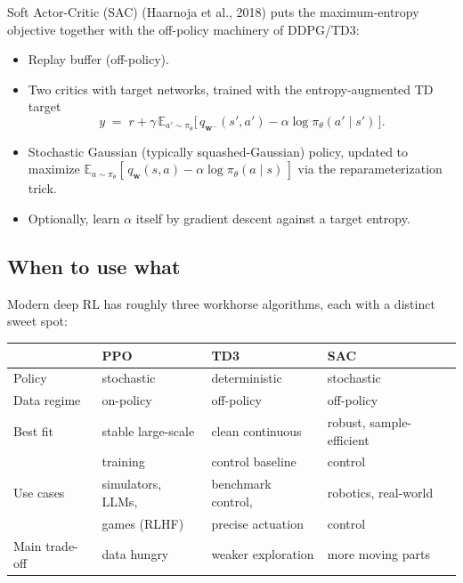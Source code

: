 \documentclass[11pt, oneside]{book}
\newcommand{\E}{\mathbb{E}}              %
\begin{document}
Soft Actor-Critic (SAC) (Haarnoja et al., 2018) puts the maximum-entropy objective
together with the off-policy machinery of DDPG/TD3:
\begin{itemize}
  \item Replay buffer (off-policy).
  \item Two critics with target networks, trained with the entropy-augmented TD target
  \[
    y \;=\; r + \gamma\, \E_{a' \sim \pi_\theta}\!\bigl[\, q_{\mathbf{w}^-}(s', a') - \alpha \log \pi_\theta(a' \mid s')\, \bigr].
  \]
  \item Stochastic Gaussian (typically squashed-Gaussian) policy, updated to maximize
    $\E_{a \sim \pi_\theta}[\, q_\mathbf{w}(s,a) - \alpha \log \pi_\theta(a \mid s)\, ]$
    via the reparameterization trick.
  \item Optionally, learn $\alpha$ itself by gradient descent against a target entropy.
\end{itemize}

\subsection{When to use what}

Modern deep RL has roughly three workhorse algorithms, each with a distinct sweet spot:

\begin{center}
\begin{tabular}{llll}
\toprule
                & \textbf{PPO}        & \textbf{TD3}       & \textbf{SAC} \\
\midrule
Policy          & stochastic           & deterministic       & stochastic \\
Data regime     & on-policy            & off-policy          & off-policy \\
Best fit        & stable large-scale   & clean continuous    & robust, sample-efficient \\
                & training             & control baseline    & control \\
Use cases       & simulators, LLMs,    & benchmark control,  & robotics, real-world \\
                & games (RLHF)         & precise actuation   & control \\
Main trade-off  & data hungry          & weaker exploration  & more moving parts \\
\bottomrule
\end{tabular}
\end{center}
\end{document}
